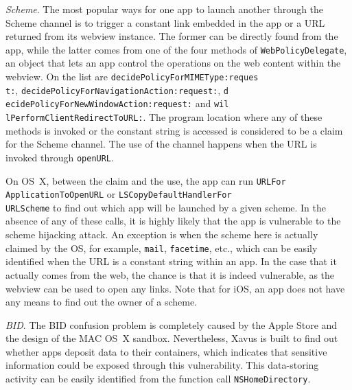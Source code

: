 \documentclass{article}
\begin{document}
\vspace {3pt}\noindent\textit{ Scheme}. The most popular ways for one app to launch another through the Scheme channel is to trigger a constant link embedded in the app or a URL returned from its webview instance. The former can be directly found from the app, while the latter comes from one of the four methods of \texttt{WebPolicyDelegate}, an object that lets an app control the operations on the web content within the webview. On the list are \texttt{decidePolicyForMIMEType:reques\\t:}, \texttt{decidePolicyForNavigationAction:request:},  \texttt{d\\ecidePolicyForNewWindowAction:request:} and \texttt{wil\\lPerformClientRedirectToURL:}. The program location where any of these methods is invoked or the constant string is accessed is considered to be a claim for the Scheme channel.  The use of the channel happens when the URL is invoked through \texttt{openURL}.

On OS~X, between the claim and the use, the app can run \texttt{URLFor\\ApplicationToOpenURL} or \texttt{LSCopyDefaultHandlerFor\\URLScheme} to find out which app will be launched by a given scheme. In the absence of any of these calls, it is highly likely that the app is vulnerable to the scheme hijacking attack. An exception is when the scheme here is actually claimed by the OS, for example, \texttt{mail}, \texttt{facetime}, etc., which can be easily identified when the URL is a constant string within an app. In the case that it actually comes from the web, the chance is that it is indeed vulnerable, as the webview can be used to open any links. Note that for iOS, an app does not have any means to find out the owner of a scheme.

\vspace {3pt}\noindent\textit{ BID}. The BID confusion problem is completely caused by the Apple Store and the design of the MAC OS~X sandbox. Nevertheless, Xavus is built to find out whether apps deposit data to their containers, which indicates that sensitive information could be exposed through this vulnerability.  This data-storing activity can be easily identified from the function call \texttt{NSHomeDirectory}.
\end{document}
